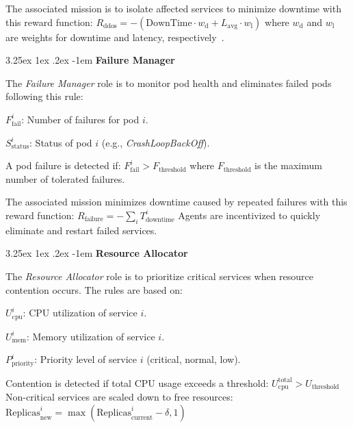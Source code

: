 \documentclass[conference]{IEEEtran}
\makeatletter
\renewcommand\paragraph{\@startsection{paragraph}{5}{\z@}%
  {3.25ex \@plus1ex \@minus.2ex}%
  {-1em}%
  {\normalfont\normalsize\bfseries}}
\makeatother
\begin{document}
The associated mission is to isolate affected services to minimize downtime with this reward function:
$R_{\text{ddos}} = - \left( \text{DownTime} \cdot w_{\text{d}} + L_{\text{avg}} \cdot w_{\text{l}} \right)$
where \( w_{\text{d}} \) and \( w_{\text{l}} \) are weights for downtime and latency, respectively~\cite{koller2019ddos}.

\noindent \paragraph{\textbf{Failure Manager}}

The \textit{Failure Manager} role is to monitor pod health and eliminates failed pods following this rule:
\begin{enumerate*}[label={}, itemjoin={;\quad }]
    \item \( F_{\text{fail}}^i \): Number of failures for pod \( i \).
    \item \( S_{\text{status}}^i \): Status of pod \( i \) (e.g., \textit{CrashLoopBackOff}).
\end{enumerate*}
A pod failure is detected if:
$F_{\text{fail}}^i > F_{\text{threshold}}$
where \( F_{\text{threshold}} \) is the maximum number of tolerated failures.

The associated mission minimizes downtime caused by repeated failures with this reward function:
$R_{\text{failure}} = - \sum_{i} T_{\text{downtime}}^i$
Agents are incentivized to quickly eliminate and restart failed services.

\noindent \paragraph{\textbf{Resource Allocator}}

The \textit{Resource Allocator} role is to prioritize critical services when resource contention occurs. The rules are based on:
\begin{enumerate*}[label={}, itemjoin={;\quad }]
    \item \( U_{\text{cpu}}^i \): CPU utilization of service \( i \).
    \item \( U_{\text{mem}}^i \): Memory utilization of service \( i \).
    \item \( P_{\text{priority}}^i \): Priority level of service \( i \) (critical, normal, low).
\end{enumerate*}
Contention is detected if total CPU usage exceeds a threshold:
$U_{\text{cpu}}^{\text{total}} > U_{\text{threshold}}$
Non-critical services are scaled down to free resources:
$\text{Replicas}_{\text{new}}^i = \max\left( \text{Replicas}_{\text{current}}^i - \delta, 1 \right)$
\end{document}

